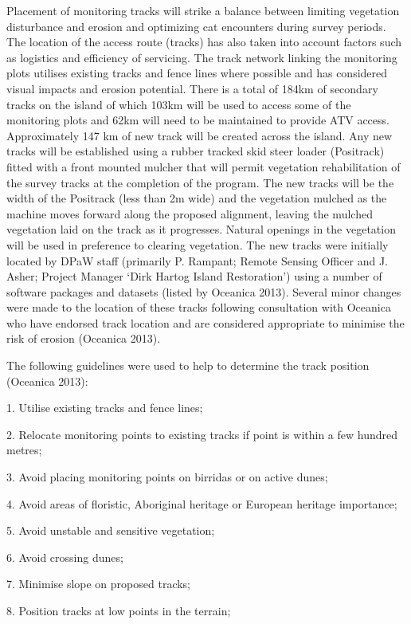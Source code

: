 \documentclass[version=last,
    paper=a4,                               %
    10pt,                                   %
    dvipsnames,
    oneside,                              %
    headings=openany,                       %
    open=any,
    BCOR=7mm,                               %
    DIV=15,     %
]{scrbook}
\begin{document}
Placement of monitoring tracks will strike a balance between limiting
vegetation disturbance and erosion and optimizing cat encounters during
survey periods. The location of the access route (tracks) has also taken
into account factors such as logistics and efficiency of servicing. The
track network linking the monitoring plots utilises existing tracks and
fence lines where possible and has considered visual impacts and erosion
potential. There is a total of 184km of secondary tracks on the island
of which 103km will be used to access some of the monitoring plots and
62km will need to be maintained to provide ATV access. Approximately 147
km of new track will be created across the island. Any new tracks will
be established using a rubber tracked skid steer loader (Positrack)
fitted with a front mounted mulcher that will permit vegetation
rehabilitation of the survey tracks at the completion of the program.
The new tracks will be the width of the Positrack (less than 2m wide)
and the vegetation mulched as the machine moves forward along the
proposed alignment, leaving the mulched vegetation laid on the track as
it progresses. Natural openings in the vegetation will be used in
preference to clearing vegetation. The new tracks were initially located
by DPaW staff (primarily P. Rampant; Remote Sensing Officer and J.
Asher; Project Manager `Dirk Hartog Island Restoration') using a number
of software packages and datasets (listed by Oceanica 2013). Several
minor changes were made to the location of these tracks following
consultation with Oceanica who have endorsed track location and are
considered appropriate to minimise the risk of erosion (Oceanica 2013).

The following guidelines were used to help to determine the track
position (Oceanica 2013):

1. Utilise existing tracks and fence lines;

2. Relocate monitoring points to existing tracks if point is within a
few hundred metres;

3. Avoid placing monitoring points on birridas or on active dunes;

4. Avoid areas of floristic, Aboriginal heritage or European heritage
importance;

5. Avoid unstable and sensitive vegetation;

6. Avoid crossing dunes;

7. Minimise slope on proposed tracks;

8. Position tracks at low points in the terrain;
\end{document}

